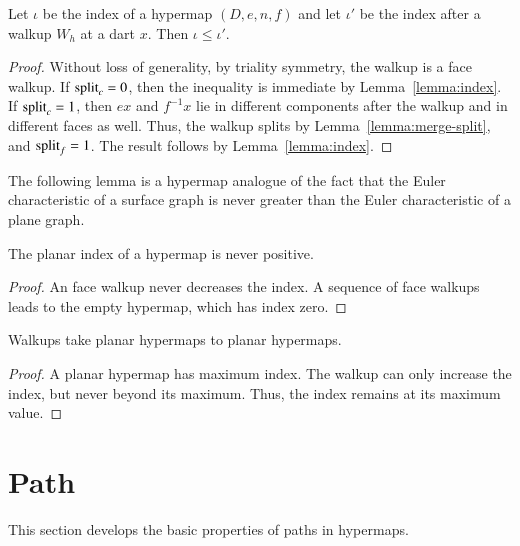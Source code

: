 \begin{lemma}\label{lemma:planar-index2}
Let $\iota$ be the index of a hypermap $(D,e,n,f)$ and let $\iota'$
be the index after a walkup $W_h$ at a dart $x$.  Then $\iota \le
\iota'$.
\end{lemma} 


\begin{proof} Without loss of generality, by triality symmetry, the
walkup is a face walkup.  If ${\operatorname{split}}_c=0$, then the inequality is
immediate by Lemma~\ref{lemma:index}.  If ${\operatorname{split}}_c=1$, 
then $e x$ and $f^{-1} x$ lie in
different components after the walkup and in different
faces as well.  Thus, the walkup splits by Lemma~\ref{lemma:merge-split}, and
  ${\operatorname{split}}_f = 1$.  The result
follows by Lemma~\ref{lemma:index}.
\end{proof}

The following lemma is a hypermap analogue of the fact that the Euler characteristic
of a surface graph is never greater than the Euler characteristic of a plane graph.

\begin{lemma}
\label{lemma:planar-nonpos}  
The planar index
of a hypermap is never positive.
\end{lemma}

\begin{proof}  An face walkup never decreases the index.  A sequence
of face walkups leads to the empty hypermap, which has
index zero.
\end{proof}


\begin{lemma}
\label{lemma:walkup-planar}
Walkups take planar hypermaps to planar
hypermaps.
\end{lemma}

\begin{proof}  
A planar hypermap has maximum index.  The walkup
can only increase the index, but never beyond its maximum.  
Thus, the index remains at its maximum value.
\end{proof}





\section{Path}

This section develops the basic properties of paths in hypermaps.


